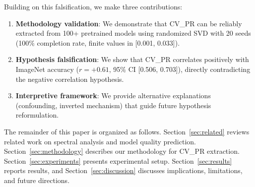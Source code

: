 Building on this falsification, we make three contributions:

\begin{enumerate}
    \item \textbf{Methodology validation}: We demonstrate that CV\_PR can be reliably extracted from 100+ pretrained models using randomized SVD with 20 seeds (100\% completion rate, finite values in [0.001, 0.033]).

    \item \textbf{Hypothesis falsification}: We show that CV\_PR correlates positively with ImageNet accuracy ($r = +0.61$, 95\% CI [0.506, 0.703]), directly contradicting the negative correlation hypothesis.

    \item \textbf{Interpretive framework}: We provide alternative explanations (confounding, inverted mechanism) that guide future hypothesis reformulation.
\end{enumerate}

The remainder of this paper is organized as follows. Section~\ref{sec:related} reviews related work on spectral analysis and model quality prediction. Section~\ref{sec:methodology} describes our methodology for CV\_PR extraction. Section~\ref{sec:experiments} presents experimental setup. Section~\ref{sec:results} reports results, and Section~\ref{sec:discussion} discusses implications, limitations, and future directions.
